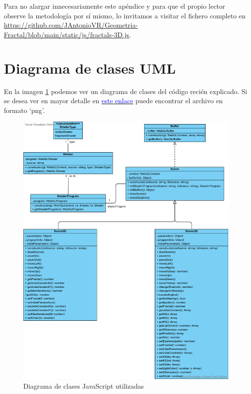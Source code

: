 Para no alargar innecesariamente este apéndice y para que el propio lector observe la metodología por sí mismo, lo invitamos a visitar el fichero completo en \url{https://github.com/JAntonioVR/Geometria-Fractal/blob/main/static/js/fractals-3D.js}.

\section{Diagrama de clases UML}

En la imagen \ref{fig:UML} podemos ver un diagrama de clases del código recién explicado. Si se desea ver en mayor detalle en \href{https://github.com/JAntonioVR/Geometria-Fractal/blob/main/memoria/img/UML.png}{\textcolor{blue}{este enlace}} puede encontrar el archivo en formato `png'.

\begin{figure} [ht]
\centering
\includegraphics[scale = 0.45]{img/UML.png}
\caption{Diagrama de clases JavaScript utilizadas}
    \label{fig:UML}
\end{figure}